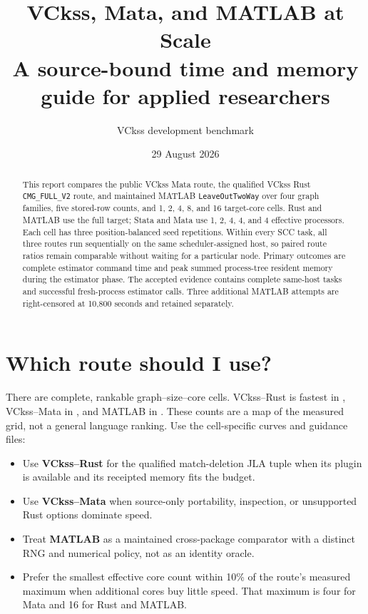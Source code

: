 \documentclass[11pt]{article}
\title{\textbf{VCkss, Mata, and MATLAB at Scale}\\
\large A source-bound time and memory guide for applied researchers}
\author{VCkss development benchmark}
\date{29 August 2026}
\begin{document}
\maketitle

\begin{abstract}
This report compares the public VCkss Mata route, the qualified VCkss Rust
\texttt{CMG\_FULL\_V2} route, and maintained MATLAB \texttt{LeaveOutTwoWay}
over four graph families, five stored-row counts, and 1, 2, 4, 8, and 16
target-core cells. Rust and MATLAB use the full target; Stata and Mata use
1, 2, 4, 4, and 4 effective processors. Each cell has three position-balanced
seed repetitions. Within
every SCC task, all three routes run sequentially on the same scheduler-assigned
host, so paired route ratios remain comparable without waiting for a particular
node. Primary outcomes are complete estimator command time and peak summed
process-tree resident memory during the estimator phase. The accepted evidence
contains \ValidatedTasks{} complete same-host tasks and \EstimatorCalls{}
successful fresh-process estimator calls. Three additional MATLAB attempts are
right-censored at 10,800 seconds and retained separately.
\end{abstract}

\section*{Which route should I use?}

There are \CompleteCells{} complete, rankable graph--size--core cells.
VCkss--Rust is fastest in \RustFastest{}, VCkss--Mata in \MataFastest{}, and
MATLAB in \MatlabFastest{}. These counts are a map of the measured grid, not a
general language ranking. Use the cell-specific curves and guidance files:

\begin{itemize}
  \item Use \textbf{VCkss--Rust} for the qualified match-deletion JLA tuple
        when its plugin is available and its receipted memory fits the budget.
  \item Use \textbf{VCkss--Mata} when source-only portability, inspection, or
        unsupported Rust options dominate speed.
  \item Treat \textbf{MATLAB} as a maintained cross-package comparator with a
        distinct RNG and numerical policy, not as an identity oracle.
  \item Prefer the smallest effective core count within 10\% of the route's
        measured maximum when additional cores buy little speed. That maximum
        is four for Mata and 16 for Rust and MATLAB.
\end{itemize}
\end{document}
